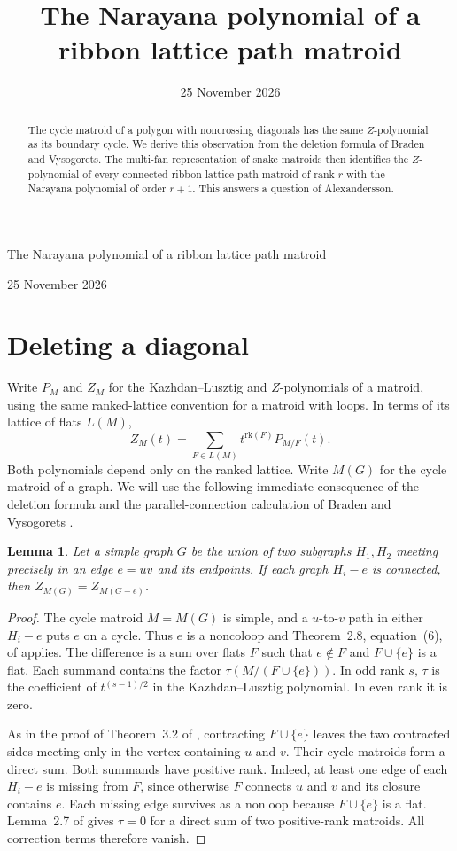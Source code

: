\documentclass[11pt]{article}
\title{The Narayana polynomial of a ribbon lattice path matroid}
\author{}
\date{25 November 2026}
\newtheorem{lemma}[theorem]{Lemma}
\begin{document}
\begin{center}
{\LARGE The Narayana polynomial of a ribbon lattice path matroid\par}
\vspace{0.8em}
25 November 2026
\end{center}
\begin{abstract}
The cycle matroid of a polygon with noncrossing diagonals has the same
$Z$-polynomial as its boundary cycle. We derive this observation from the
deletion formula of Braden and Vysogorets. The multi-fan representation of
snake matroids then identifies the $Z$-polynomial of every connected ribbon
lattice path matroid of rank $r$ with the Narayana polynomial of order $r+1$.
This answers a question of Alexandersson.
\end{abstract}

\section{Deleting a diagonal}
Write $P_M$ and $Z_M$ for the Kazhdan--Lusztig and $Z$-polynomials of a
matroid, using the same ranked-lattice convention for a matroid with
loops. In terms of its lattice of flats $L(M)$,
\[
 Z_M(t)=\sum_{F\in L(M)}t^{\mathrm{rk}(F)}P_{M/F}(t).
\]
Both polynomials depend only on the ranked lattice. Write $M(G)$ for the
cycle matroid of a graph. We will use the following immediate consequence
of the deletion formula and the parallel-connection calculation of
Braden and Vysogorets \cite{bv}.

\begin{lemma}\label{lem}
Let a simple graph $G$ be the union of two subgraphs $H_1,H_2$ meeting
precisely in an edge $e=uv$ and its endpoints. If each graph $H_i-e$ is
connected, then $Z_{M(G)}=Z_{M(G-e)}$.
\end{lemma}
\begin{proof}
The cycle matroid $M=M(G)$ is simple, and a $u$-to-$v$ path in either
$H_i-e$ puts $e$ on a cycle. Thus $e$ is a noncoloop and Theorem~2.8,
equation~(6), of \cite{bv} applies. The difference is a sum over flats $F$
such that $e\notin F$ and $F\cup\{e\}$ is a flat. Each summand contains
the factor $\tau(M/(F\cup\{e\}))$. In odd rank $s$, $\tau$ is the
coefficient of $t^{(s-1)/2}$ in the Kazhdan--Lusztig polynomial. In even
rank it is zero.

As in the proof of Theorem~3.2 of \cite{bv}, contracting $F\cup\{e\}$
leaves the two contracted sides meeting only in the vertex containing
$u$ and $v$. Their cycle matroids form a direct sum. Both summands have
positive rank. Indeed, at least one edge of each $H_i-e$ is missing from
$F$, since otherwise $F$ connects $u$ and $v$ and its closure contains $e$.
Each missing edge survives as a nonloop because $F\cup\{e\}$ is a flat.
Lemma~2.7 of \cite{bv} gives $\tau=0$ for a direct sum of two positive-rank
matroids. All correction terms therefore vanish.
\end{proof}
\end{document}
